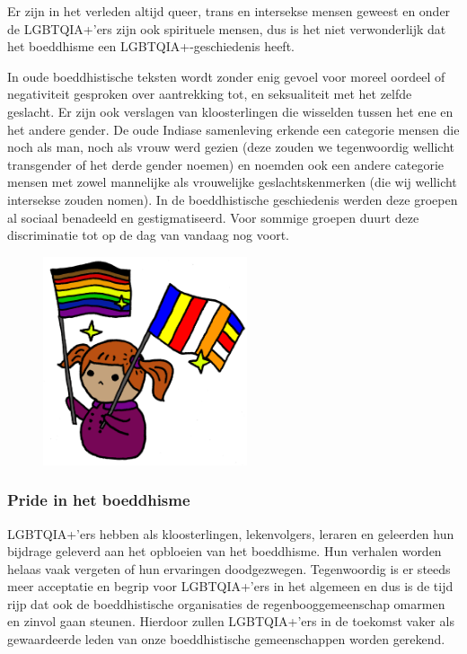 \documentclass[12pt,openany]{book}
\begin{document}
Er zijn in het verleden altijd queer, trans en intersekse mensen geweest en onder de LGBTQIA+’ers zijn ook spirituele mensen, dus is het niet verwonderlijk dat het boeddhisme een LGBTQIA+-geschiedenis heeft.

In oude boeddhistische teksten wordt zonder enig gevoel voor moreel oordeel of negativiteit gesproken over aantrekking tot, en seksualiteit met het zelfde geslacht. Er zijn ook verslagen van kloosterlingen die wisselden tussen het ene en het andere gender. De oude Indiase samenleving erkende een categorie mensen die noch als man, noch als vrouw werd gezien (deze zouden we tegenwoordig wellicht transgender of het derde gender noemen) en noemden ook een andere categorie mensen met zowel mannelijke als vrouwelijke geslachtskenmerken (die wij wellicht intersekse zouden nomen). In de boeddhistische geschiedenis werden deze groepen al sociaal benadeeld en gestigmatiseerd. Voor sommige groepen duurt deze discriminatie tot op de dag van vandaag nog voort.

\begin{figure}[t]
\includegraphics[width=6cm]{9.png}
\centering
\end{figure}

\subsubsection*{Pride in het boeddhisme}

LGBTQIA+'ers hebben als kloosterlingen, lekenvolgers, leraren en geleerden hun bijdrage geleverd aan het opbloeien van het boeddhisme. Hun verhalen worden helaas vaak vergeten of hun ervaringen doodgezwegen. Tegenwoordig is er steeds meer acceptatie en begrip voor LGBTQIA+’ers in het algemeen en dus is de tijd rijp dat ook de boeddhistische organisaties de regenbooggemeenschap omarmen en zinvol gaan steunen. Hierdoor zullen LGBTQIA+’ers in de toekomst vaker als gewaardeerde leden van onze boeddhistische gemeenschappen worden gerekend.
\end{document}

